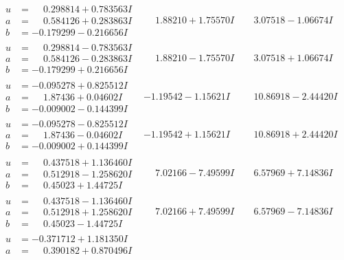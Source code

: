 \documentclass[1p]{elsarticle_modified}
\theoremstyle{definition}
\begin{document}
$$\begin{array}{c|c|c}
\begin{aligned}
u &= \phantom{-}0.298814 + 0.783563 I \\
a &= \phantom{-}0.584126 + 0.283863 I \\
b &= -0.179299 - 0.216656 I\end{aligned}
 & \phantom{-}1.88210 + 1.75570 I & \phantom{-}3.07518 - 1.06674 I \\ \hline\begin{aligned}
u &= \phantom{-}0.298814 - 0.783563 I \\
a &= \phantom{-}0.584126 - 0.283863 I \\
b &= -0.179299 + 0.216656 I\end{aligned}
 & \phantom{-}1.88210 - 1.75570 I & \phantom{-}3.07518 + 1.06674 I \\ \hline\begin{aligned}
u &= -0.095278 + 0.825512 I \\
a &= \phantom{-}1.87436 + 0.04602 I \\
b &= -0.009002 - 0.144399 I\end{aligned}
 & -1.19542 - 1.15621 I & \phantom{-}10.86918 - 2.44420 I \\ \hline\begin{aligned}
u &= -0.095278 - 0.825512 I \\
a &= \phantom{-}1.87436 - 0.04602 I \\
b &= -0.009002 + 0.144399 I\end{aligned}
 & -1.19542 + 1.15621 I & \phantom{-}10.86918 + 2.44420 I \\ \hline\begin{aligned}
u &= \phantom{-}0.437518 + 1.136460 I \\
a &= \phantom{-}0.512918 - 1.258620 I \\
b &= \phantom{-}0.45023 + 1.44725 I\end{aligned}
 & \phantom{-}7.02166 - 7.49599 I & \phantom{-}6.57969 + 7.14836 I \\ \hline\begin{aligned}
u &= \phantom{-}0.437518 - 1.136460 I \\
a &= \phantom{-}0.512918 + 1.258620 I \\
b &= \phantom{-}0.45023 - 1.44725 I\end{aligned}
 & \phantom{-}7.02166 + 7.49599 I & \phantom{-}6.57969 - 7.14836 I \\ \hline\begin{aligned}
u &= -0.371712 + 1.181350 I \\
a &= \phantom{-}0.390182 + 0.870496 I \\

\end{aligned}
\end{array}$$
\end{document}
